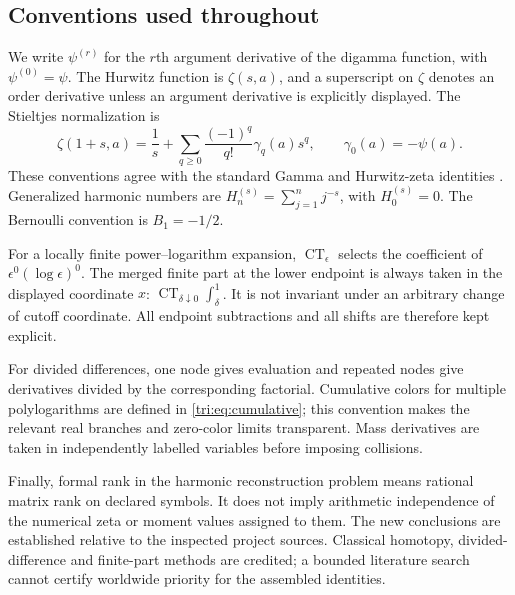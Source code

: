 \documentclass[11pt,a4paper]{article}
\theoremstyle{definition}
\theoremstyle{remark}
\numberwithin{equation}{section}
\newcommand{\CT}{\operatorname{CT}}
\begin{document}
\subsection{Conventions used throughout}

We write $\psi^{(r)}$ for the $r$th argument derivative of the digamma
function, with $\psi^{(0)}=\psi$. The Hurwitz function is
$\zeta(s,a)$, and a superscript on $\zeta$ denotes an order derivative
unless an argument derivative is explicitly displayed. The Stieltjes
normalization is
\begin{equation}\label{intro:Stieltjes}
\zeta(1+s,a)=\frac1s+
    \sum_{q\ge0}\frac{(-1)^q}{q!}\gamma_q(a)s^q,
\qquad \gamma_0(a)=-\psi(a).
\end{equation}
These conventions agree with the standard Gamma and Hurwitz-zeta
identities \cite{DLMF,DLMFHurwitz}.
Generalized harmonic numbers are
$H_n^{(s)}=\sum_{j=1}^n j^{-s}$, with $H_0^{(s)}=0$.
The Bernoulli convention is $B_1=-1/2$.

For a locally finite power--logarithm expansion,
$\CT_\epsilon$ selects the coefficient of
$\epsilon^0(\log\epsilon)^0$. The merged finite part at the lower
endpoint is always taken in the displayed coordinate $x$:
$\CT_{\delta\downarrow0}\int_\delta^1$.
It is not invariant under an arbitrary change of cutoff coordinate.
All endpoint subtractions and all shifts are therefore kept explicit.

For divided differences, one node gives evaluation and repeated nodes
give derivatives divided by the corresponding factorial. Cumulative
colors for multiple polylogarithms are defined in
\eqref{tri:eq:cumulative}; this convention makes the relevant real
branches and zero-color limits transparent. Mass derivatives are taken
in independently labelled variables before imposing collisions.

Finally, formal rank in the harmonic reconstruction problem means
rational matrix rank on declared symbols. It does not imply arithmetic
independence of the numerical zeta or moment values assigned to them.
The new conclusions are established relative to the inspected project
sources. Classical homotopy, divided-difference and finite-part methods
are credited; a bounded literature search cannot certify worldwide
priority for the assembled identities.

\end{document}
